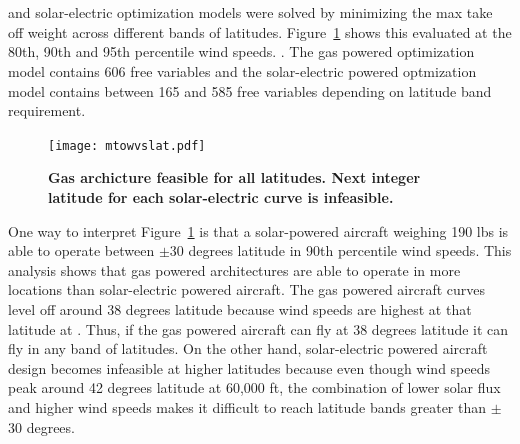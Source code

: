 \DIFdelbegin \section{}
\addtocounter{section}{-1}%
\DIFdelend \DIFaddbegin \subsection{}
\DIFaddend 

\DIFdelbegin {}\DIFdelend \DIFaddbegin {}\DIFaddend and solar-electric \DIFdelbegin {}\DIFdelend \DIFaddbegin {}\DIFaddend optimization models were solved by minimizing the max take off weight across different bands of latitudes. 
Figure~\ref{f:latvsmtowtrade} shows this \DIFdelbegin {}\DIFdelend \DIFaddbegin {}\DIFaddend evaluated at the 80th, 90th and 95th percentile wind speeds.  
\DIFdelbegin {}\DIFdelend \DIFaddbegin {}\DIFaddend .
The gas powered optimization model contains 606 free variables and the solar-electric powered optmization model contains between 165 and 585 free variables depending on latitude band requirement. 

\begin{figure}[H]
	\begin{center}
	\texttt{[image: mtowvslat.pdf]}
    \caption{\textbf{Gas archicture feasible for all latitudes. Next integer latitude for each solar-electric curve is infeasible.}}
    \label{f:latvsmtowtrade}
	\end{center}
\end{figure}

One way to interpret Figure~\ref{f:latvsmtowtrade} is that a solar-powered aircraft weighing 190 lbs is able to operate between $\pm$30 degrees \DIFdelbegin {}\DIFdelend latitude in 90th percentile wind speeds.  
This analysis shows that gas powered architectures are able to operate in more locations than solar-electric powered aircraft.  
The gas powered aircraft curves level off around 38 degrees latitude because wind speeds are highest at that latitude at \DIFdelbegin {}\DIFdelend \DIFaddbegin {}\DIFaddend . 
Thus, if the gas powered aircraft can fly at 38 degrees latitude it can fly in any band of latitudes.  
On the other hand, solar-electric powered aircraft design becomes infeasible at higher latitudes because even though wind speeds peak around 42 degrees latitude at 60,000 ft, the combination of lower solar flux and higher wind speeds makes it difficult to reach latitude bands greater than $\pm$30 degrees. 


